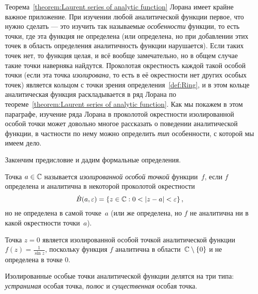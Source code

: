 \documentclass[../complex-analysis.tex]{subfiles}
\begin{document}
Теорема~\ref{theorem:Laurent series of analytic function} Лорана имеет крайне важное приложение. При изучении любой аналитической функции первое, что нужно сделать --- это изучить так называемые \emph{особенности} функции, то есть точки, где эта функция не определена (или определена, но при добавлении этих точек в область определения аналитичность функции нарушается). Если таких точек нет, то функция целая, и всё вообще замечательно, но в общем случае такие точки наверняка найдутся. Проколотая окрестность каждой такой особой точки (если эта точка \emph{изолирована}, то есть в её окрестности нет других особых точек) является кольцом с точки зрения определения~\ref{def:Ring}, и в этом кольце аналитическая функция раскладывается в ряд Лорана по теореме~\ref{theorem:Laurent series of analytic function}. Как мы покажем в этом параграфе, изучение ряда Лорана в проколотой окрестности изолированной особой точки может довольно многое рассказать о поведении аналитической функции, в частности по нему можно определить \emph{тип} особенности, с которой мы имеем дело.

Закончим предисловие и дадим формальные определения.

\begin{df}
 Точка $ a \in \mathbb{C} $ называется \textit{изолированной особой точкой} функции~$ f $, если $ f $ определена и аналитична в некоторой проколотой окрестности
 \begin{align*}
  \dot B(a, \varepsilon) = \left\{z\in\mathbb{C} : 0 < \left| z-a \right| < \varepsilon\right\},
 \end{align*} но не определена в самой точке~$ a $ (или же определена, но $ f $ не аналитична ни в какой окрестности точки~$ a $).
\end{df}
\begin{exmpl}
 Точка $ z = 0 $ является изолированной особой точкой аналитической функции $ f(z) = \frac{1}{\sin z} $, поскольку функция $ f $ аналитична в области~$ \mathbb{C} \setminus \left\{ 0 \right\} $ и не определена в точке $ 0 $.
\end{exmpl}

Изолированные особые точки аналитической функции делятся на три типа: \emph{устранимая} особая точка, \emph{полюс} и \emph{существенная} особая точка.
\end{document}
